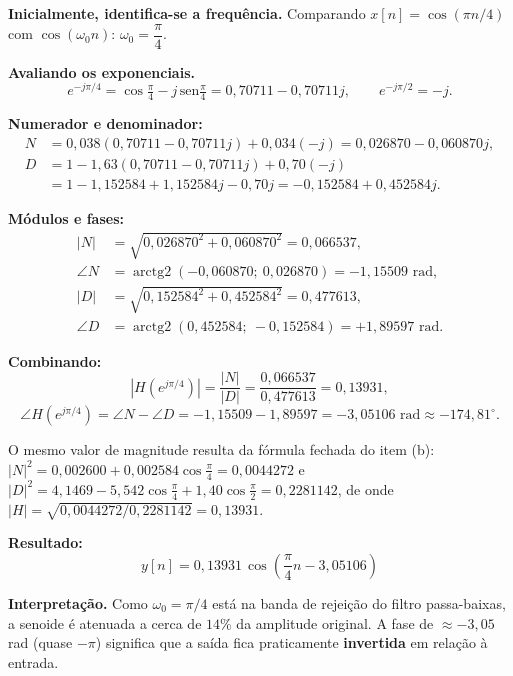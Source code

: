\documentclass[12pt]{article}
\begin{document}
\medskip
\noindent\textbf{Inicialmente, identifica-se a frequência.} Comparando
$x[n] = \cos(\pi n/4)$ com $\cos(\omega_0 n)$: $\omega_0 = \dfrac{\pi}{4}$.

\noindent\textbf{Avaliando os exponenciais.}
\[
e^{-j\pi/4} = \cos\tfrac{\pi}{4} - j\,\mathrm{sen}\tfrac{\pi}{4}
 = 0{,}70711 - 0{,}70711j,
\qquad
e^{-j\pi/2} = -j.
\]

\noindent\textbf{Numerador e denominador:}
\[
\begin{aligned}
N &= 0{,}038(0{,}70711 - 0{,}70711j) + 0{,}034(-j) = 0{,}026870 - 0{,}060870j,\\
D &= 1 - 1{,}63(0{,}70711 - 0{,}70711j) + 0{,}70(-j)\\
  &= 1 - 1{,}152584 + 1{,}152584j - 0{,}70j = -0{,}152584 + 0{,}452584j.
\end{aligned}
\]

\noindent\textbf{Módulos e fases:}
\[
\begin{aligned}
|N| &= \sqrt{0{,}026870^2 + 0{,}060870^2} = 0{,}066537,\\
\angle N &= \operatorname{arctg2}(-0{,}060870;\ 0{,}026870) = -1{,}15509 \text{ rad},\\[1mm]
|D| &= \sqrt{0{,}152584^2 + 0{,}452584^2} = 0{,}477613,\\
\angle D &= \operatorname{arctg2}(0{,}452584;\ -0{,}152584) = +1{,}89597 \text{ rad}.
\end{aligned}
\]

\noindent\textbf{Combinando:}
\[
\left|H(e^{j\pi/4})\right| = \frac{|N|}{|D|}
 = \frac{0{,}066537}{0{,}477613} = 0{,}13931,
\]
\[
\angle H(e^{j\pi/4}) = \angle N - \angle D
 = -1{,}15509 - 1{,}89597 = -3{,}05106 \text{ rad} \approx -174{,}81^\circ.
\]

O mesmo valor de magnitude resulta da fórmula fechada do item (b):
$|N|^2 = 0{,}002600 + 0{,}002584\cos\frac{\pi}{4} = 0{,}0044272$ e
$|D|^2 = 4{,}1469 - 5{,}542\cos\frac{\pi}{4} + 1{,}40\cos\frac{\pi}{2} = 0{,}2281142$,
de onde $|H| = \sqrt{0{,}0044272/0{,}2281142} = 0{,}13931$.

\medskip
\noindent\textbf{Resultado:}
\[
\boxed{
y[n] = 0{,}13931\,\cos\!\left(\frac{\pi}{4}n - 3{,}05106\right)
}
\]

\noindent\textbf{Interpretação.} Como $\omega_0 = \pi/4$ está na banda de rejeição do
filtro passa-baixas, a senoide é atenuada a cerca de $14\%$ da amplitude original. A
fase de $\approx -3{,}05$ rad (quase $-\pi$) significa que a saída fica praticamente
\textbf{invertida} em relação à entrada.
\end{document}
